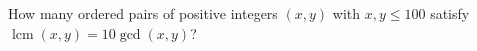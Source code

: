 How many ordered pairs of positive integers $(x,y)$ with $x,y\le100$ satisfy $\operatorname{lcm}(x,y)=10\gcd(x,y)$?
